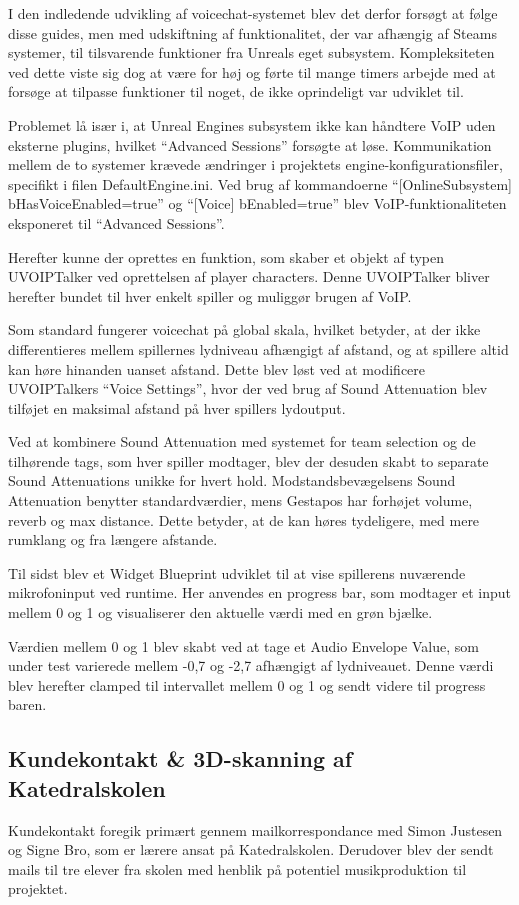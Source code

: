 I den indledende udvikling af voicechat-systemet blev det derfor forsøgt at følge disse guides, men med udskiftning af funktionalitet, der var afhængig af Steams systemer, til tilsvarende funktioner fra Unreals eget subsystem. Kompleksiteten ved dette viste sig dog at være for høj og førte til mange timers arbejde med at forsøge at tilpasse funktioner til noget, de ikke oprindeligt var udviklet til.

Problemet lå især i, at Unreal Engines subsystem ikke kan håndtere VoIP uden eksterne plugins, hvilket “Advanced Sessions” forsøgte at løse. Kommunikation mellem de to systemer krævede ændringer i projektets engine-konfigurationsfiler, specifikt i filen DefaultEngine.ini. Ved brug af kommandoerne “[OnlineSubsystem] bHasVoiceEnabled=true” og “[Voice] bEnabled=true” blev VoIP-funktionaliteten eksponeret til “Advanced Sessions”.

Herefter kunne der oprettes en funktion, som skaber et objekt af typen UVOIPTalker ved oprettelsen af player characters. Denne UVOIPTalker bliver herefter bundet til hver enkelt spiller og muliggør brugen af VoIP.

Som standard fungerer voicechat på global skala, hvilket betyder, at der ikke differentieres mellem spillernes lydniveau afhængigt af afstand, og at spillere altid kan høre hinanden uanset afstand. Dette blev løst ved at modificere UVOIPTalkers “Voice Settings”, hvor der ved brug af Sound Attenuation blev tilføjet en maksimal afstand på hver spillers lydoutput.

Ved at kombinere Sound Attenuation med systemet for team selection og de tilhørende tags, som hver spiller modtager, blev der desuden skabt to separate Sound Attenuations unikke for hvert hold. Modstandsbevægelsens Sound Attenuation benytter standardværdier, mens Gestapos har forhøjet volume, reverb og max distance. Dette betyder, at de kan høres tydeligere, med mere rumklang og fra længere afstande.

Til sidst blev et Widget Blueprint udviklet til at vise spillerens nuværende mikrofoninput ved runtime. Her anvendes en progress bar, som modtager et input mellem 0 og 1 og visualiserer den aktuelle værdi med en grøn bjælke.

Værdien mellem 0 og 1 blev skabt ved at tage et Audio Envelope Value, som under test varierede mellem -0,7 og -2,7 afhængigt af lydniveauet. Denne værdi blev herefter clamped til intervallet mellem 0 og 1 og sendt videre til progress baren.


\newpage
\subsection{Kundekontakt \& 3D-skanning af Katedralskolen}
Kundekontakt foregik primært gennem mailkorrespondance med Simon Justesen og Signe Bro, som er lærere ansat på Katedralskolen. Derudover blev der sendt mails til tre elever fra skolen med henblik på potentiel musikproduktion til projektet.

